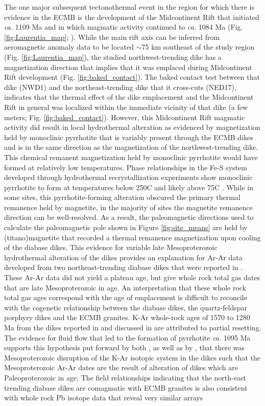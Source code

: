 \documentclass[draft]{agujournal2019}
\begin{document}
The one major subsequent tectonothermal event in the region for which there is evidence in the ECMB is the development of the Midcontinent Rift that initiated \textit{ca.} 1109 Ma and in which magmatic activity continued to \textit{ca.} 1084 Ma (Fig. \ref{fig:Laurentia_map}; ). While the main rift axis can be inferred from aeromagnetic anomaly data to be located $\sim$75 km southeast of the study region (Fig. \ref{fig:Laurentia_map}), the studied northwest-trending dike has a magnetization direction that implies that it was emplaced during Midcontinent Rift development (Fig. \ref{fig:baked_contact}). The baked contact test between that dike (NWD1) and the northeast-trending dike that it cross-cuts (NED17), indicates that the thermal effect of the dike emplacement and the Midcontinent Rift in general was localized within the immediate vicinity of that dike (a few meters; Fig. \ref{fig:baked_contact}). However, this Midcontinent Rift magmatic activity did result in local hydrothermal alteration as evidenced by magnetization held by monoclinic pyrrhotite that is variably present through the ECMB dikes and is in the same direction as the magnetization of the northwest-trending dike. This chemical remanent magnetization held by monoclinic pyrrhotite would have formed at relatively low temperatures. Phase relationships in the Fe-S system developed through hydrothermal recrystallization experiments show monoclinic pyrrhotite to form at temperatures below 250\textdegree C and likely above 75\textdegree C \cite{Kissin1982a}. While in some sites, this pyrrhotite-forming alteration obscured the primary thermal remanence held by magnetite, in the majority of sites the magnetite remanence direction can be well-resolved. As a result, the paleomagnetic directions used to calculate the paleomagnetic pole shown in Figure \ref{fig:site_means} are held by (titano)magnetite that recorded a thermal remanence magnetization upon cooling of the diabase dikes. This evidence for variable late Mesoproterozoic hydrothermal alteration of the dikes provides an explanation for Ar-Ar data developed from two northeast-trending diabase dikes that were reported in \cite{Boerboom2000a}. These Ar-Ar data did not yield a plateau age, but give whole rock total gas dates that are late Mesoproterozoic in age. An interpretation that these whole rock total gas ages correspond with the age of emplacement is difficult to reconcile with the cogenetic relationship between the diabase dikes, the quartz-feldspar porphyry dikes and the ECMB granites. K-Ar whole-rock ages of 1570 to 1280 Ma from the dikes reported in  and discussed in  are attributed to partial resetting. The evidence for fluid flow that led to the formation of pyrrhotite \textit{ca.} 1095 Ma supports this hypothesis put forward by both , as well as by , that there was Mesoproterozoic disruption of the K-Ar isotopic system in the dikes such that the Mesoproterozoic Ar-Ar dates are the result of alteration of dikes which are Paleoproterozoic in age. The field relationships indicating that the north-east trending diabase dikes are comagmatic with ECMB granites is also consistent with whole rock Pb isotope data that reveal very similar arrays 
\end{document}
